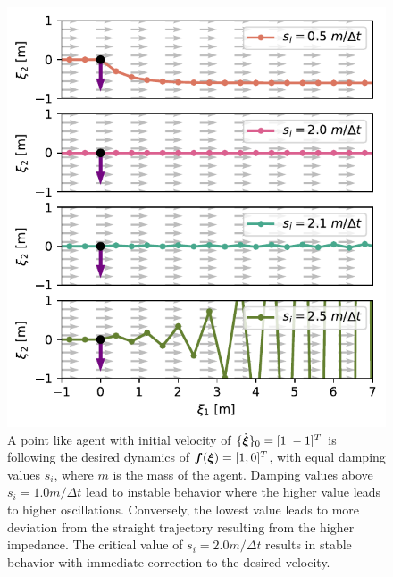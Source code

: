 \begin{figure}[htb]
\centering
  \includegraphics[width=\columnwidth]{figures/discrete_controller_parameters_comparison}
  \caption{A point like agent with initial velocity of $\{ \dot{\boldsymbol{\xi}} \}_0 = [1 \; -1]^T$ is following the desired dynamics of $\boldsymbol{f}(\boldsymbol{\xi}) = [1, 0]^T$, with equal damping values $s_i$, where $m$ is the mass of the agent. Damping values above $s_i = 1.0 m / \Delta t$ lead to instable behavior where the higher value leads to higher oscillations. Conversely, the lowest value leads to more deviation from the straight trajectory resulting from the higher impedance. The critical value of $s_i = 2.0 m / \Delta t$ results in stable behavior with immediate correction to the desired velocity.}
  \label{fig:discrete_controller_parameters_comparison}
\end{figure}


